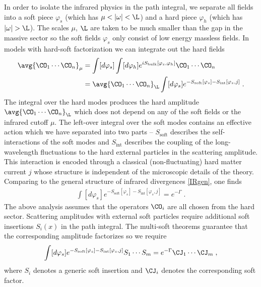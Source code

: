 \documentclass[11pt]{article}
\def\G{{\Gamma}}
\def\o{{\omega}}
\begin{document}
In order to isolate the infrared physics in the path integral, we separate all fields into a soft piece $\varphi_s$ (which has $\mu < |\o| < \L$) and a hard piece $\varphi_h$ (which has $|\o| > \L$). The scales $\mu$, $\L$ are taken to be much smaller than the gap in the massive sector so the soft fields $\varphi_s$ only consist of low energy massless fields. In models with hard-soft factorization we can integrate out the hard fields
\begin{equation}
\begin{split}\label{hardpathintegral}
\avg{ \CO_1 \cdots \CO_n }_\mu &= \int [d \varphi_{s}  ] \int [ d \varphi_{h} ] e^{ i S_{\text{bulk}} [ \varphi_s , \varphi_h ] } \CO_1 \cdots \CO_n \\
&= \avg{ \CO_1 \cdots \CO_n }_\L \int  [d \varphi_{s} ] e^{ - S_{\text{soft}} [ \varphi_s ] - S_{\text{int}} [ \varphi_s , j ]  }  \;  .
\end{split}
\end{equation}
The integral over the hard modes produces the hard amplitude $\avg{ \CO_1 \cdots \CO_n }_\L$ which does not depend on any of the soft fields or the infrared cutoff $\mu$. The left-over integral over the soft modes contains an effective action which we have separated into two parts -- $S_{\text{soft}}$ describes the self-interactions of the soft modes and $S_{\text{int}}$  describes the coupling of the long-wavelength fluctuations to the hard external particles in the scattering amplitude. This interaction is encoded through a classical (non-fluctuating) hard matter current $j$ whose structure is independent of the microscopic details of the  theory. Comparing to the general structure of infrared divergences \eqref{IRgen}, one finds
\begin{equation}
\begin{split}\label{IR-res-soft}
 \int  [d \varphi_{s} ] e^{ - S_{\text{soft}} [ \varphi_s ] - S_{\text{int}} [ \varphi_s , j ]  } = e^{ - \G}  \; .
\end{split}
\end{equation}
The above analysis assumes that the operators $\CO_i$ are all chosen from the hard sector. Scattering amplitudes with external soft particles require additional soft insertions $S_i(x)$ in the path integral. The multi-soft theorems guarantee that the corresponding amplitude factorizes so we require
\begin{equation}
\begin{split}\label{IR-res-soft-1}
 \int  [d \varphi_{s} ] e^{ - S_{\text{soft}} [ \varphi_s ] - S_{\text{int}} [ \varphi_s , j ]  } S_1 \cdots S_m = e^{ - \G}  \CJ_1 \cdots \CJ_m  \; ,
\end{split}
\end{equation}
where $S_i$ denotes a generic soft insertion and $\CJ_i$ denotes the corresponding soft factor.
\end{document}

